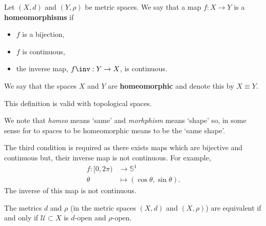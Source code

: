 \documentclass[12pt, a4paper]{article}
\begin{document}
\begin{definition}
    Let \((X,d)\) and \((Y,\rho)\) be metric spaces. We say that a map \(f : X \to Y\) is a \textbf{homeomorphisms} if 
    \begin{itemize}
        \item \(f\) is a bijection,
        \item \(f\) is continuous,
        \item the inverse map, \(f\inv :Y \to X\), is continuous.
    \end{itemize}
    We say that the spaces \(X\) and \(Y\) are \textbf{homeomorphic} and denote this by \(X \equiv Y\).
\end{definition}

\begin{mdremark}
    This definition is valid with topological spaces.
\end{mdremark}

\begin{mdnote}
    We note that \textit{homeo} means `same' and \textit{morhphism} means `shape' so, in some sense for to spaces to be homeomorphic means to be the `same shape'.
\end{mdnote}

\begin{mdremark}
    The third condition is required as there exists maps which are bijective and continuous but, their inverse map is not continuous. For example, 
    \[\begin{aligned}
        f:[0,2\pi) &\to \mathbb{S}^1 \\
        \theta &\mapsto (\cos\theta,\sin\theta).
    \end{aligned}\]
    The inverse of this map is not continuous.
\end{mdremark}

\begin{mdprop}
    The metrics \(d\) and \(\rho\) (in the metric spaces \((X,d)\) and \((X,\rho)\)) are equivalent if and only if \(\mathcal{U} \subset X\) is \(d\)-open and \(\rho\)-open.
\end{mdprop}
\end{document}
